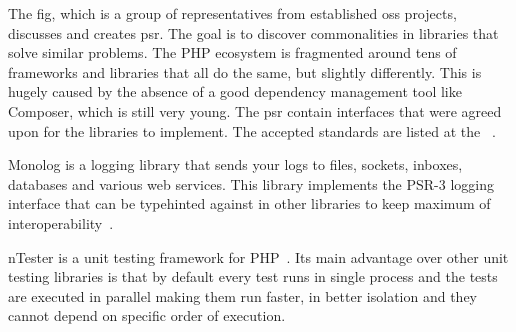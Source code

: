 The \gls{fig}, which is a group of representatives from established \gls{oss} projects, discusses and creates \gls{psr}. The goal is to discover commonalities in libraries that solve similar problems. The PHP ecosystem is fragmented around tens of frameworks and libraries that all do the same, but slightly differently. This is hugely caused by the absence of a good dependency management tool like Composer, which is still very young. The \gls{psr} contain interfaces that were agreed upon for the libraries to implement. The accepted standards are listed at the ~\cite{fig:psr}.

 \label{sec:theory:monolog}

Monolog is a logging library that sends your logs to files, sockets, inboxes, databases and various web services. This library implements the PSR-3 logging interface that can be typehinted against in other libraries to keep maximum of interoperability~\cite{monolog:readme}.

 \label{sec:theory:nette-tester}

\gls{nTester} is a unit testing framework for PHP~\cite{tester:docs}. Its main advantage over other unit testing libraries is that by default every test runs in single process and the tests are executed in parallel making them run faster, in better isolation and they cannot depend on specific order of execution.
